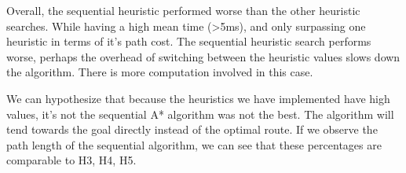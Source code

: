 Overall, the sequential heuristic performed worse than the other heuristic searches. While having a high mean time (>5ms), and only surpassing one heuristic in terms of it's path cost. The sequential heuristic search performs worse, perhaps the overhead of switching between the heuristic values slows down the algorithm. There is more computation involved in this case.

We can hypothesize that because the heuristics we have implemented have high values, it's not the sequential A* algorithm was not the best. The algorithm will tend towards the goal directly instead of the optimal route. If we observe the path length of the sequential algorithm, we can see that these percentages are comparable to H3, H4, H5.
